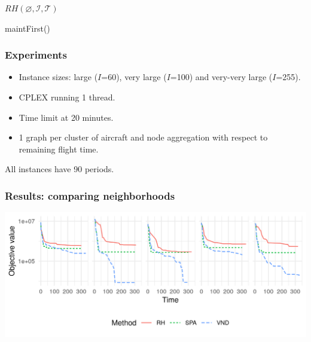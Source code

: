 \begin{frame}
  $RH(\varnothing, \mathcal{I}, \mathcal{T})$ \\


  maintFirst()

\end{frame}

\begin{frame}
\frametitle{\textbf{Experiments}}
  
  \begin{itemize}

  \item Instance sizes: large ($I$=60), very large ($I$=100) and very-very large ($I$=255).
  \item CPLEX running 1 thread.
  \item Time limit at 20 minutes.
  \item 1 graph per cluster of aircraft and node aggregation with respect to remaining flight time.
  \end{itemize}

  \pause

  All instances have 90 periods.
\end{frame}

\begin{frame}
\frametitle{\textbf{Results: comparing neighborhoods}}
  \includegraphics[width=\linewidth]{images/compare_neighbors.png}
\end{frame}

